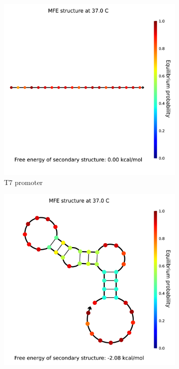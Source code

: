 \begin{figure}[h]
\begin{subfigure}{.32\columnwidth}
  \centering
  \includegraphics[width=\linewidth]{images/0_analysis.png}
  \caption{T7 promoter}
\end{subfigure}%
\begin{subfigure}{.32\columnwidth}
  \centering
  \includegraphics[width=\linewidth]{images/1_analysis.png}

\end{subfigure}
\end{figure}
